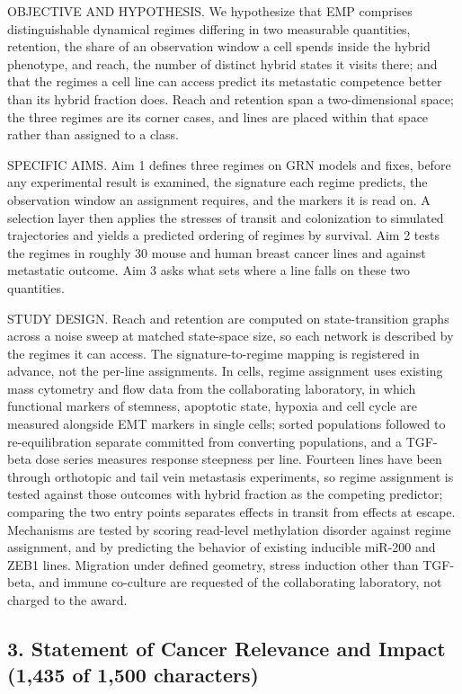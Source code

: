 \documentclass[12pt,letterpaper]{article}
\newcommand{\chg}[1]{\textcolor{chgcolor}{#1}}
\newcommand{\chg}[1]{#1}
\begin{document}
OBJECTIVE AND HYPOTHESIS. We hypothesize that EMP comprises distinguishable dynamical regimes differing in two measurable quantities, \chg{retention, the share of an observation window a cell spends inside the hybrid phenotype, and reach, the number of distinct hybrid states it visits there;} and that the regimes a cell line can access predict its metastatic competence better than its hybrid fraction does. Reach and retention span a two-dimensional space; the three regimes are its corner cases, and lines are placed within that space rather than assigned to a class.

SPECIFIC AIMS. Aim 1 defines three regimes on GRN models and fixes, before any experimental result is examined, the signature each regime predicts, the observation window an assignment requires, and the markers it is read on. A selection layer then applies the stresses of transit and colonization to simulated trajectories and yields a predicted ordering of regimes by survival. Aim 2 tests the regimes in roughly 30 mouse and human breast cancer lines and against metastatic outcome. Aim 3 asks what sets where a line falls on these two quantities.

STUDY DESIGN. Reach and retention are computed on state-transition graphs across a noise sweep at matched state-space size, so each network is described by the regimes it can access. The signature-to-regime mapping is registered in advance, not the per-line assignments. In cells, regime assignment uses existing mass cytometry and flow data from the collaborating laboratory, in which functional markers of stemness, apoptotic state, hypoxia and cell cycle are measured alongside EMT markers in single cells; sorted populations followed to re-equilibration separate committed from converting populations, and a TGF-beta dose series measures response steepness per line. Fourteen lines have been through orthotopic and tail vein metastasis experiments, so regime assignment is tested against those outcomes with hybrid fraction as the competing predictor; comparing the two entry points separates effects in transit from effects at escape. Mechanisms are tested by scoring read-level methylation disorder against regime assignment, and by predicting the behavior of existing inducible miR-200 and ZEB1 lines. Migration under defined geometry, stress induction other than TGF-beta, and immune co-culture are requested of the collaborating laboratory, not charged to the award.

\subsection*{3. Statement of Cancer Relevance and Impact (1,435 of 1,500 characters)}
\end{document}
